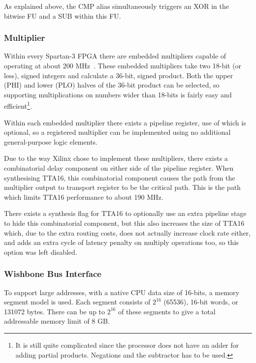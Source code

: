As explained above, the CMP alias simultaneously triggers an XOR in the bitwise
FU and a SUB within this FU.


\subsubsection{Multiplier}
\label{TTA_Multiply}


Within every Spartan-3 FPGA there are embedded multipliers capable of operating
at about 200 MHz~\cite{Xilinx_SP3_DS}. These embedded multipliers take two 18-bit
(or less), signed integers and calculate a 36-bit, signed product. Both the upper
(PHI) and lower (PLO) halves of the 36-bit product can be selected, so supporting
multiplications on numbers wider than 18-bits is fairly easy and
efficient\footnote{It is still quite complicated since the processor does not
have an adder for adding partial products. Negations and the subtractor has to be
used.}.

Within each embedded multiplier there exists a pipeline register, use of which
is optional, so a registered multiplier can be implemented using no additional
general-purpose logic elements.

Due to the way Xilinx chose to implement these multipliers, there exists a
combinatorial delay component on either side of the pipeline register. When
synthesising TTA16, this combinatorial component causes the path from the
multiplier output to transport register to be the critical path. This is the
path which limits TTA16 performance to about 190 MHz.

There exists a synthesis flag for TTA16 to optionally use an extra pipeline
stage to hide this combinatorial component, but this also increases the size
of TTA16 which, due to the extra routing costs, does not actually increase
clock rate either, and adds an extra cycle of latency penalty on multiply
operations too, so this option was left disabled.


\subsubsection{Wishbone Bus Interface}


To support large addresses, with a native CPU data size of 16-bits, a memory
segment model is used. Each segment consists of $2^{16}$ (65536), 16-bit words,
or 131072 bytes. There can be up to $2^{16}$ of these segments to give a total
addressable memory limit of 8 GB.

